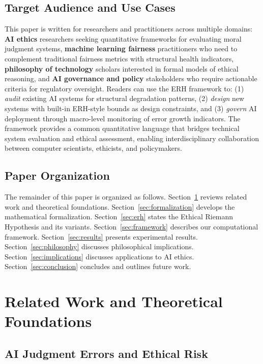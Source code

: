\documentclass[12pt,a4paper]{article}
\theoremstyle{definition}
\theoremstyle{remark}
\begin{document}
\subsection{Target Audience and Use Cases}

This paper is written for researchers and practitioners across multiple domains: \textbf{AI ethics} researchers seeking quantitative frameworks for evaluating moral judgment systems, \textbf{machine learning fairness} practitioners who need to complement traditional fairness metrics with structural health indicators, \textbf{philosophy of technology} scholars interested in formal models of ethical reasoning, and \textbf{AI governance and policy} stakeholders who require actionable criteria for regulatory oversight. Readers can use the ERH framework to: (1) \emph{audit} existing AI systems for structural degradation patterns, (2) \emph{design} new systems with built-in ERH-style bounds as design constraints, and (3) \emph{govern} AI deployment through macro-level monitoring of error growth indicators. The framework provides a common quantitative language that bridges technical system evaluation and ethical assessment, enabling interdisciplinary collaboration between computer scientists, ethicists, and policymakers.

\subsection{Paper Organization}

The remainder of this paper is organized as follows. Section~\ref{sec:related} reviews related work and theoretical foundations. Section~\ref{sec:formalization} develops the mathematical formalization. Section~\ref{sec:erh} states the Ethical Riemann Hypothesis and its variants. Section~\ref{sec:framework} describes our computational framework. Section~\ref{sec:results} presents experimental results. Section~\ref{sec:philosophy} discusses philosophical implications. Section~\ref{sec:implications} discusses applications to AI ethics. Section~\ref{sec:conclusion} concludes and outlines future work.

\section{Related Work and Theoretical Foundations}
\label{sec:related}

\subsection{AI Judgment Errors and Ethical Risk}
\end{document}
